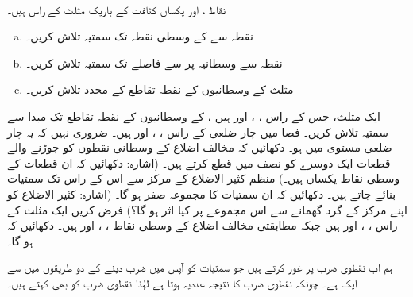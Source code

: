\\
نقاط ،  اور   یکساں کثافت کے باریک مثلث کے راس ہیں۔ 
\begin{enumerate}[a.]
\item
نقطہ  سے  کے وسطی نقطہ  تک سمتیہ تلاش کریں۔
\item
نقطہ  سے وسطانیہ  پر  سے  فاصلے تک سمتیہ تلاش کریں۔
\item
مثلث  کے وسطانیوں کے نقطہ تقاطع کے محدد تلاش کریں۔
\end{enumerate}
ایک مثلث،  جس کے راس ، ،  اور  ہیں ، کے وسطانیوں کے نقطہ تقاطع تک مبدا سے سمتیہ تلاش کریں۔ 
فضا میں چار ضلعی  کے راس ، ،  اور  ہیں۔ ضروری نہیں کہ یہ  چار ضلعی  مستوی میں   ہو۔ دکھائیں کہ مخالف اضلاع کے وسطانی نقطوں کو جوڑنے والے قطعات ایک دوسرے کو نصف میں قطع کرتے ہیں۔ (اشارہ: دکھائیں کہ ان قطعات کے وسطی نقاط یکساں ہیں۔)
منظم  کثیر الاضلاع کے مرکز سے اس کے راس تک سمتیات بنائے جاتے ہیں۔ دکھائیں کہ ان سمتیات کا مجموعہ صفر ہو گا۔ (اشارہ: کثیر الاضلاع کو اپنے مرکز کے گرد گھمانے سے اس مجموعے پر کیا اثر ہو گا؟)
فرض کریں ایک مثلث کے راس ،  ، اور  ہیں جبکہ مطابقتی مخالف اضلاع کے وسطی نقاط ، ،  اور  ہیں۔ دکھائیں کہ  ہو گا۔


ہم اب نقطوی ضرب پر غور کرتے ہیں جو سمتیات کو آپس میں ضرب دینے کے دو طریقوں میں سے ایک ہے۔ چونکہ نقطوی ضرب کا نتیجہ عددیہ ہوتا ہے لہٰذا نقطوی ضرب کو  بھی کہتے ہیں۔

